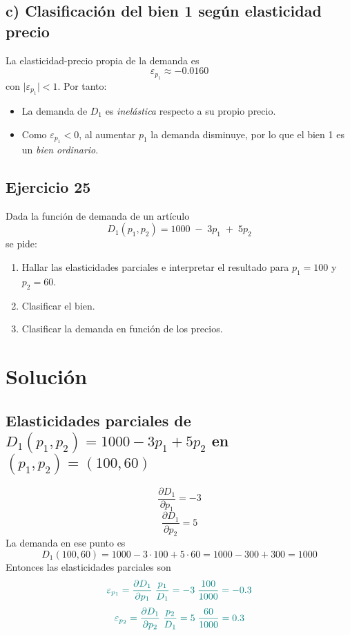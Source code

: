 \documentclass{article}
\begin{document}
\subsection*{c) Clasificación del bien 1 según elasticidad precio}

La elasticidad-precio propia de la demanda es
\[
\varepsilon_{p_1}\approx -0.0160
\]
con \(\bigl|\varepsilon_{p_1}\bigr|<1\). Por tanto:
\begin{itemize}
  \item La demanda de \(D_1\) es {\color{teal}\emph{inelástica}} respecto a su propio precio.
  \item Como \(\varepsilon_{p_1}<0\), al aumentar \(p_1\) la demanda disminuye, por lo que el bien 1 es un {\color{teal}\emph{bien ordinario}}.
\end{itemize}


\newpage


\subsection{Ejercicio 25}

Dada la función de demanda de un artículo
\[
D_{1}(p_{1},p_{2}) = 1000 \;-\; 3p_{1} \;+\; 5p_{2}
\]
se pide:
\begin{enumerate}
  \item Hallar las elasticidades parciales e interpretar el resultado para \(p_{1}=100\) y \(p_{2}=60\).
  \item Clasificar el bien.
  \item Clasificar la demanda en función de los precios.
\end{enumerate}

\newpage
\section*{Solución}
\subsection*{Elasticidades parciales de \(D_{1}(p_{1},p_{2})=1000-3p_{1}+5p_{2}\) en \((p_{1},p_{2})=(100,60)\)}

\[
\frac{\partial D_{1}}{\partial p_{1}}=-3
\]
\[
\frac{\partial D_{1}}{\partial p_{2}}=5
\]
La demanda en ese punto es
\[
D_{1}(100,60)=1000-3\cdot100+5\cdot60=1000-300+300=1000
\]
Entonces las elasticidades parciales son
\[
\color{teal}{\varepsilon_{p_{1}} =\frac{\partial D_{1}}{\partial p_{1}}\;\frac{p_{1}}{D_{1}} =-3\;\frac{100}{1000} =-0.3}
\]
\[
\color{teal}{\varepsilon_{p_{2}} =\frac{\partial D_{1}}{\partial p_{2}}\;\frac{p_{2}}{D_{1}} =5\;\frac{60}{1000} =0.3}
\]
\end{document}
